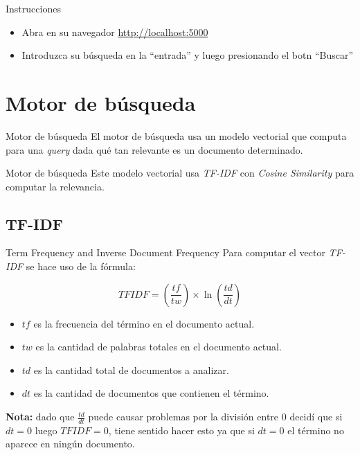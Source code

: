 \documentclass{beamer}
\begin{document}
\begin{frame}{Instrucciones}
  \begin{itemize}
    \item Abra en su navegador \href{http://localhost:5000}{http://localhost:5000}
    \item Introduzca su búsqueda en la ``entrada'' y luego presionando el botn ``Buscar''
  \end{itemize}
\end{frame}

\section*{Motor de búsqueda}

\begin{frame}{Motor de búsqueda}
  El motor de búsqueda usa un modelo vectorial que computa para una {\it query}
  dada qué tan relevante es un documento determinado.
\end{frame}

\begin{frame}{Motor de búsqueda}
  Este modelo vectorial usa
    {\it TF-IDF} con {\it Cosine
      Similarity} para computar la relevancia.
\end{frame}

\subsection*{TF-IDF}

\begin{frame}{Term Frequency and Inverse Document Frequency}
  Para computar el vector {\it TF-IDF}
  se hace uso de la fórmula:

  \begin{equation}
    TFIDF = (\frac{tf}{tw}) \times \ln(\frac{td}{dt}) \nonumber
  \end{equation}

  \begin{itemize}
    \item $tf$ es la frecuencia del término en el documento actual.
    \item $tw$ es la cantidad de palabras totales en el documento actual.
    \item $td$ es la cantidad total de documentos a analizar.
    \item $dt$ es la cantidad de documentos que contienen el término.
  \end{itemize}

  \pause

  {\bf \color{red} Nota:} dado que $\frac{td}{dt}$ puede causar problemas por la
  división entre $0$ decidí que si $dt = 0$ luego $TFIDF = 0$, tiene sentido hacer esto ya
  que si $dt = 0$ el término no aparece en ningún documento.
\end{frame}
\end{document}
